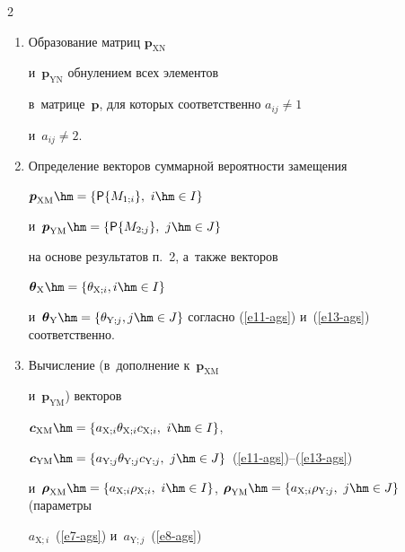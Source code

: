 \begin{multicols}{2}
\begin{enumerate}[1.]
в~мат\-ри\-цах~$\boldsymbol{c}$, $\boldsymbol{p}$ и~$\boldsymbol{\rho}$ всех 


элементов $(i,j)$, для которых $a_{ij}\not= 0$. 


  \item Образование матриц $\boldsymbol{p}_{\mathrm{XN}}$ 


и~$\boldsymbol{p}_{\mathrm{YN}}$ обнулением всех элементов  


в~мат\-ри\-це~$\boldsymbol{p}$, для которых соответственно $a_{ij}\not=1$ 


и~$a_{ij}\not= 2$. 


  \item  Определение векторов суммарной вероятности замещения 


$\boldsymbol{p}_{\mathrm{XM}}\hm = \left\{ {\sf P}\{M_{1;i}\},\ i \hm\in I\right\}$ 


и~$\boldsymbol{p}_{\mathrm{YM}}\hm = \left\{ {\sf P}\{ M_{2;j}\},\ j \hm\in J\right\}$ 


на основе результатов п.~2, а~также векторов 


$\boldsymbol{\theta}_{\mathrm{X}}\hm = \left\{\theta_{\mathrm{X};i}, 


i \hm\in I\right\}$ 


и~$\boldsymbol{\theta}_{\mathrm{Y}}\hm = \left\{\theta_{\mathrm{Y};j}, 


j \hm\in J\right\}$ согласно (\ref{e11-ags}) и~(\ref{e13-ags}) соответственно. 


  \item  Вычисление (в~дополнение к~$\boldsymbol{p}_{\mathrm{XM}}$ 


и~$\boldsymbol{p}_{\mathrm{YM}}$) векторов 


$\boldsymbol{c}_{\mathrm{XM}}\hm= \{a_{\mathrm{X};i} 


\theta_{\mathrm{X};i}c_{\mathrm{X};i},\ i\hm\in I\}$,


  $\boldsymbol{c}_{\mathrm{YM}}\hm= \{a_{\mathrm{Y};j} 


\theta_{\mathrm{Y};j}c_{\mathrm{Y};j},\  


j\hm\in J\}$~(\ref{e11-ags})--(\ref{e13-ags}) 


и~$\boldsymbol{\rho}_{\mathrm{XM}}\hm= \{ a_{\mathrm{X};i} 


\rho_{\mathrm{X};i},\ i\hm\in I\}$, $\boldsymbol{\rho}_{\mathrm{YM}}\hm= \{ 


a_{\mathrm{X};i}\rho_{\mathrm{Y};j}, \ j\hm\in J\}$ (параметры 


$a_{\mathrm{X};i}$~(\ref{e7-ags}) и~$a_{\mathrm{Y};j}$~(\ref{e8-ags}) 



\end{enumerate}
\end{multicols}
